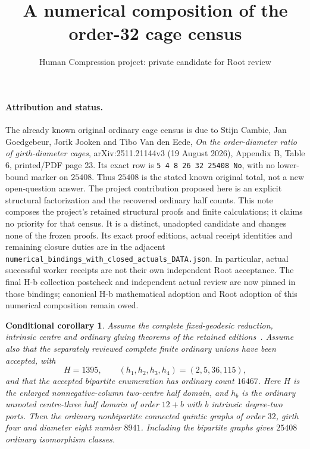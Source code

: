 \documentclass[11pt]{article}
\title{A numerical composition of the order-32 cage census}
\author{Human Compression project: private candidate for Root review}
\date{}
\newtheorem{corollary}{Conditional corollary}
\begin{document}
\maketitle

\paragraph{Attribution and status.}
The already known original ordinary cage census is due to
Stijn Cambie, Jan Goedgebeur, Jorik Jooken and Tibo Van den Eede,
\emph{On the order-diameter ratio of girth-diameter cages},
arXiv:2511.21144v3 (19 August 2026), Appendix B, Table 6, printed/PDF page 23.
Its exact row is \texttt{5 4 8 26 32 25408 No}, with no lower-bound
marker on $25408$. Thus $25408$ is the stated known original total, not
a new open-question answer. The project contribution proposed here is
an explicit structural factorization and the recovered ordinary half
counts. This note composes the project's
retained structural proofs and finite calculations; it claims no priority
for that census. It is a distinct, unadopted candidate and changes none
of the frozen proofs. Its exact proof editions, actual receipt identities
and remaining closure duties are in the adjacent
\texttt{numerical\_bindings\_with\_closed\_actuals\_DATA.json}. In particular, actual successful
worker receipts are not their own independent Root acceptance. The final H-b collection postcheck and independent actual review are
now pinned in those bindings; canonical H-b mathematical adoption and
Root adoption of this numerical composition remain owed.

\begin{corollary}
Assume the complete fixed-geodesic reduction, intrinsic centre and
ordinary gluing theorems of the retained editions~\cite{reduction,halves}.
Assume also that the separately reviewed complete finite ordinary unions
have been accepted, with
\[
 H=1395,\qquad(h_1,h_2,h_3,h_4)=(2,5,36,115),
\]
and that the accepted bipartite enumeration has ordinary count $16467$.
Here $H$ is the enlarged nonnegative-column two-centre half domain, and
$h_b$ is the ordinary unrooted centre-three half domain of order $12+b$
with $b$ intrinsic degree-two ports. Then the ordinary nonbipartite
connected quintic graphs of order $32$, girth four and diameter eight
number $8941$. Including the bipartite graphs gives $25408$ ordinary
isomorphism classes.
\end{corollary}
\end{document}
